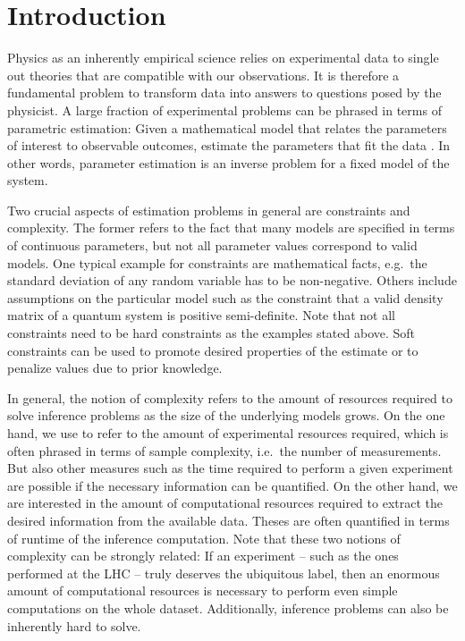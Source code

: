 
\chapter{Introduction}%
\label{chap:introduction}


Physics as an inherently empirical science relies on experimental data to single out theories that are compatible with our observations.
It is therefore a fundamental problem to transform data into answers to questions posed by the physicist.
A large fraction of experimental problems can be phrased in terms of parametric estimation:
Given a mathematical model that relates the parameters of interest to observable outcomes, estimate the parameters that fit the data .
In other words, parameter estimation is an inverse problem for a fixed model of the system.

Two crucial aspects of estimation problems in general are constraints and complexity.
The former refers to the fact that many models are specified in terms of continuous parameters, but not all parameter values correspond to valid models.
One typical example for constraints are mathematical facts, e.g.\ the standard deviation of any random variable has to be non-negative.
Others include assumptions on the particular model such as the constraint that a valid density matrix of a quantum system is positive semi-definite.
Note that not all constraints need to be hard constraints as the examples stated above.
Soft constraints can be used to promote desired properties of the estimate or to penalize values due to prior knowledge.

In general, the notion of complexity refers to the amount of resources required to solve inference problems as the size of the underlying models grows.
On the one hand, we use  to refer to the amount of experimental resources required, which is often phrased in terms of sample complexity, i.e.\ the number of measurements.
But also other measures such as the time required to perform a given experiment are possible if the necessary information can be quantified.
On the other hand, we are interested in the amount of computational resources required to extract the desired information from the available data.
Theses are often quantified in terms of runtime of the inference computation.
Note that these two notions of complexity can be strongly related:
If an experiment -- such as the ones performed at the LHC -- truly deserves the ubiquitous  label, then an enormous amount of computational resources is necessary to perform even simple computations on the whole dataset.
Additionally, inference problems can also be inherently hard to solve.\\



